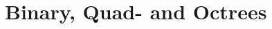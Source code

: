\documentclass[notes.tex]{subfiles}
\begin{document}
\section{Binary, Quad- and Octrees}
\end{document}
